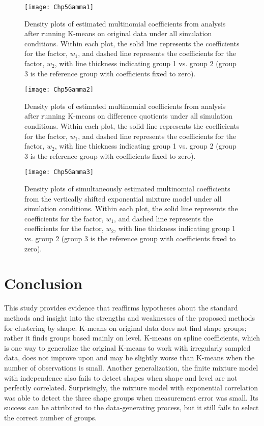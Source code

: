 \begin{figure}[h]
\begin{center}
\texttt{[image: Chp5Gamma1]}
\end{center}
\label{fig:gamma1}
\caption{Density plots of estimated multinomial coefficients from analysis after running K-means on original data under all simulation conditions. Within each plot, the solid line represents the coefficients for the factor, $w_{1}$, and dashed line represents the coefficients for the factor, $w_{2}$, with line thickness indicating group 1 vs. group 2 (group 3 is the reference group with coefficients fixed to zero).}
\end{figure}
\begin{figure}[h]
\begin{center}
\texttt{[image: Chp5Gamma2]}
\end{center}
\label{fig:gamma1}
\caption{Density plots of estimated multinomial coefficients from analysis after running K-means on difference quotients under all simulation conditions. Within each plot, the solid line represents the coefficients for the factor, $w_{1}$, and dashed line represents the coefficients for the factor, $w_{2}$, with line thickness indicating group 1 vs. group 2 (group 3 is the reference group with coefficients fixed to zero).}
\end{figure}
\begin{figure}[h]
\begin{center}
\texttt{[image: Chp5Gamma3]}
\end{center}
\label{fig:gamma1}
\caption{Density plots of simultaneously estimated multinomial coefficients from the vertically shifted exponential mixture model under all simulation conditions. Within each plot, the solid line represents the coefficients for the factor, $w_{1}$, and dashed line represents the coefficients for the factor, $w_{2}$, with line thickness indicating group 1 vs. group 2 (group 3 is the reference group with coefficients fixed to zero).}
\end{figure}


\section{Conclusion}
This study provides evidence that reaffirms hypotheses about the standard methods and insight into the strengths and weaknesses of the proposed methods for clustering by shape. K-means on original data does not find shape groups; rather it finds groups based mainly on level. K-means on spline coefficients, which is one way to generalize the original K-means to work with irregularly sampled data, does not improve upon and may be slightly worse than K-means when the number of observations is small. Another generalization, the finite mixture model with independence also fails to detect shapes when shape and level are not perfectly correlated. Surprisingly, the mixture model with exponential correlation was able to detect the three shape groups when measurement error was small. Its success can be attributed to the data-generating process, but it still fails to select the correct number of groups.

